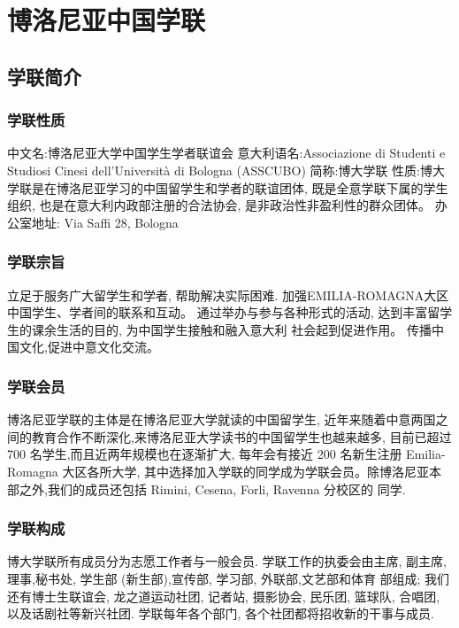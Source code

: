 \chapter{博洛尼亚中国学联}              

\section{学联简介}

\subsection{学联性质}
中文名:博洛尼亚大学中国学生学者联谊会 
意大利语名:Associazione di Studenti e Studiosi Cinesi dell'Università di Bologna (ASSCUBO)
简称:博大学联
性质:博大学联是在博洛尼亚学习的中国留学生和学者的联谊团体, 既是全意学联下属的学生组织, 也是在意大利内政部注册的合法协会, 是非政治性非盈利性的群众团体。 
办公室地址: Via Saffi 28, Bologna

\subsection{学联宗旨}
立足于服务广大留学生和学者, 帮助解决实际困难. 
加强EMILIA-ROMAGNA大区中国学生、学者间的联系和互动。 
通过举办与参与各种形式的活动, 达到丰富留学生的课余生活的目的, 为中国学生接触和融入意大利 社会起到促进作用。 
 传播中国文化,促进中意文化交流。 

\subsection{学联会员}
博洛尼亚学联的主体是在博洛尼亚大学就读的中国留学生, 近年来随着中意两国之间的教育合作不断深化,来博洛尼亚大学读书的中国留学生也越来越多, 目前已超过 700 名学生,而且近两年规模也在逐渐扩大, 每年会有接近 200 名新生注册 Emilia- Romagna 大区各所大学, 其中选择加入学联的同学成为学联会员。除博洛尼亚本部之外,我们的成员还包括 Rimini, Cesena, Forli, Ravenna 分校区的 同学. 

\subsection{学联构成}
博大学联所有成员分为志愿工作者与一般会员. 学联工作的执委会由主席, 副主席,理事,秘书处, 学生部 (新生部),宣传部, 学习部, 外联部,文艺部和体育 部组成; 我们还有博士生联谊会, 龙之道运动社团, 记者站, 摄影协会, 民乐团, 篮球队, 合唱团, 以及话剧社等新兴社团. 学联每年各个部门, 各个社团都将招收新的干事与成员. 

